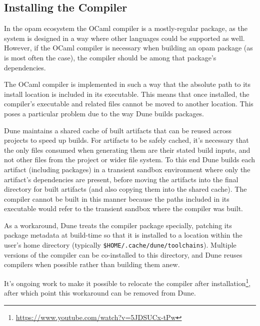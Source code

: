 \documentclass{article}
\begin{document}
\begin{multicols}{2}
        \section {Installing the Compiler}

        In the opam ecosystem the OCaml compiler is a mostly-regular package,
        as the system is designed in a way where other languages could be
        supported as well. However, if the OCaml compiler is necessary when
        building an opam package (as is most often the case), the compiler should be
        among that package's dependencies.

        The OCaml compiler is implemented in such a way that the absolute path
        to its install location is included in its executable. This means that
        once installed, the compiler's executable and related files cannot be
        moved to another location. This poses a particular problem due to the
        way Dune builds packages.

        Dune maintains a shared cache of built artifacts that can be reused
        across projects to speed up builds. For artifacts to be safely cached,
        it's necessary that the only files consumed when generating them are
        their stated build inputs, and not other files from the project or wider
        file system. To this end Dune builds each artifact (including packages)
        in a transient sandbox environment where only the artifact's
        dependencies are present, before moving the artifacts into the final
        directory for built artifacts (and also copying them into the shared
        cache). The compiler cannot be built in this manner because the paths
        included in its executable would refer to the transient sandbox where
        the compiler was built.

        As a workaround, Dune treats the compiler package specially, patching
        its package metadata at build-time so that it is installed to a location
        within the user's home directory (typically
        \texttt{\$HOME/.cache/dune/toolchains}). Multiple versions of the
        compiler can be co-installed to this directory, and Dune reuses
        compilers when possible rather than building them anew.

        It's ongoing work to make it possible to relocate the compiler after
        installation\footnote{\url{https://www.youtube.com/watch?v=5JDSUCx-tPw}},
        after which point this workaround can be removed from Dune.


\end{multicols}
\end{document}
